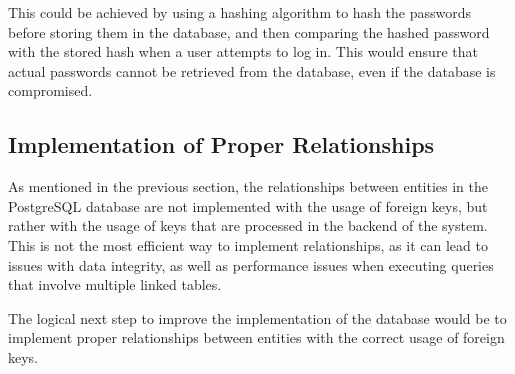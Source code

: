 This could be achieved by using a hashing algorithm to hash the passwords before storing them in the database, and then comparing the hashed password with the stored hash when a user attempts to log in. This would ensure that actual passwords cannot be retrieved from the database, even if the database is compromised.

\subsection{Implementation of Proper Relationships}

As mentioned in the previous section, the relationships between entities in the PostgreSQL database are not implemented with the usage of foreign keys, but rather with the usage of keys that are processed in the backend of the system. This is not the most efficient way to implement relationships, as it can lead to issues with data integrity, as well as performance issues when executing queries that involve multiple linked tables.

The logical next step to improve the implementation of the database would be to implement proper relationships between entities with the correct usage of foreign keys. 